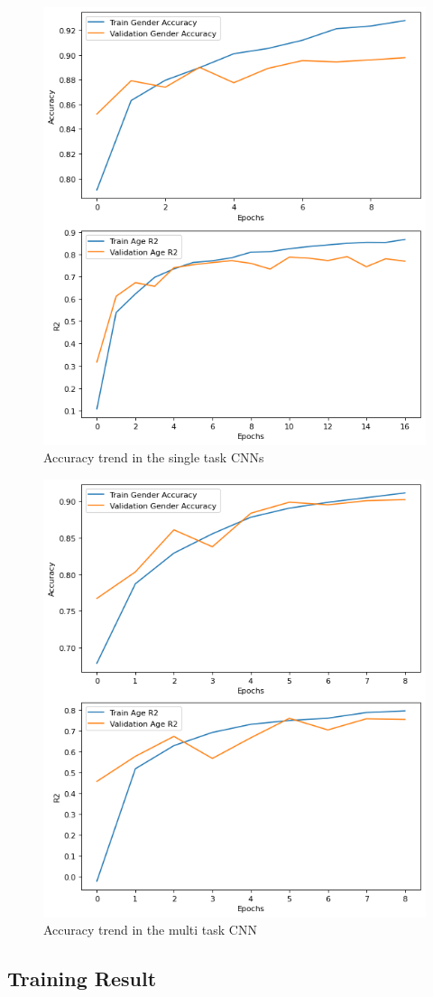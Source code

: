 \begin{figure}[htbp]
    \centerline{\includegraphics[width=.5\textwidth]{images/training/acc-single.png}}
    \caption{Accuracy trend in the single task CNNs}
    \label{4acc}
\end{figure}
\begin{figure}[htbp]
    \centerline{\includegraphics[width=.5\textwidth]{images/training/acc-multi.png}}
    \caption{Accuracy trend in the multi task CNN}
    \label{5acc}
\end{figure}

\subsection{Training Result}

